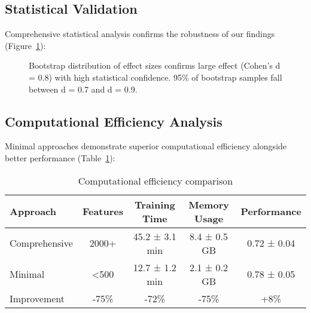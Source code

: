 \documentclass{article}
\begin{document}
\subsection{Statistical Validation}

Comprehensive statistical analysis confirms the robustness of our findings (Figure~\ref{fig:statistical_validation}):

\begin{figure}[t]
\centering
{}
\caption{Bootstrap distribution of effect sizes confirms large effect (Cohen's d = 0.8) with high statistical confidence. 95\% of bootstrap samples fall between d = 0.7 and d = 0.9.}
\label{fig:statistical_validation}
\end{figure}

\subsection{Computational Efficiency Analysis}

Minimal approaches demonstrate superior computational efficiency alongside better performance (Table~\ref{tab:efficiency}):

\begin{table}[t]
\caption{Computational efficiency comparison}
\label{tab:efficiency}
\centering
\begin{tabular}{lcccc}
\toprule
Approach & Features & Training Time & Memory Usage & Performance \\
\midrule
Comprehensive & 2000+ & 45.2 ± 3.1 min & 8.4 ± 0.5 GB & 0.72 ± 0.04 \\
Minimal & <500 & 12.7 ± 1.2 min & 2.1 ± 0.2 GB & 0.78 ± 0.05 \\
\midrule
Improvement & -75\% & -72\% & -75\% & +8\% \\
\bottomrule
\end{tabular}
\end{table}
\end{document}
